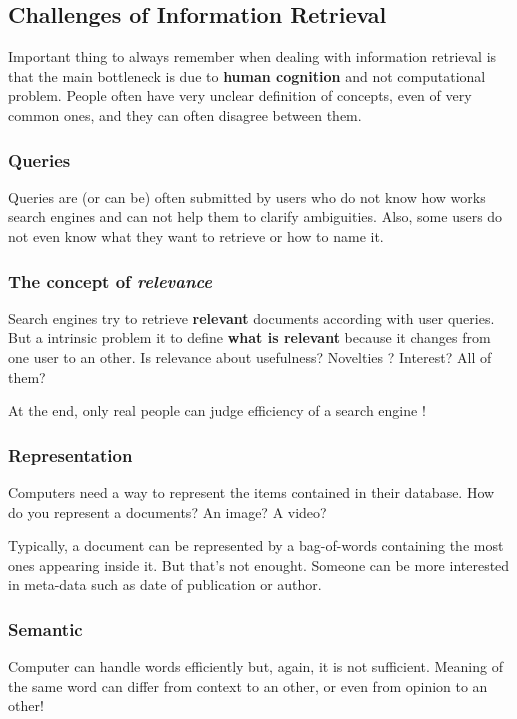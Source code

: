 \subsection{Challenges of Information Retrieval}

Important thing to always remember when dealing with information retrieval is that the main bottleneck is due to {\bf human cognition} and not computational problem. People often have very unclear definition of concepts, even of very common ones, and they can often disagree between them.

\subsubsection{Queries}

Queries are (or can be) often submitted by users who do not know how works search engines and can not help them to clarify ambiguities. Also, some users do not even know what they want to retrieve or how to name it.

\subsubsection{The concept of {\it relevance}}

Search engines try to retrieve {\bf relevant} documents according with user queries. But a intrinsic problem it to define {\bf what is relevant} because it changes from one user to an other. Is relevance about usefulness? Novelties ? Interest? All of them?

At the end, only real people can judge efficiency of a search engine !

\subsubsection{Representation}

Computers need a way to represent the items contained in their database. How do you represent a documents? An image? A video?

Typically, a document can be represented by a bag-of-words containing the most ones appearing inside it. But that's not enought. Someone can be more interested in meta-data such as date of publication or author.

\subsubsection{Semantic}

Computer can handle words efficiently but, again, it is not sufficient. Meaning of the same word can differ from context to an other, or even from opinion to an other! 

